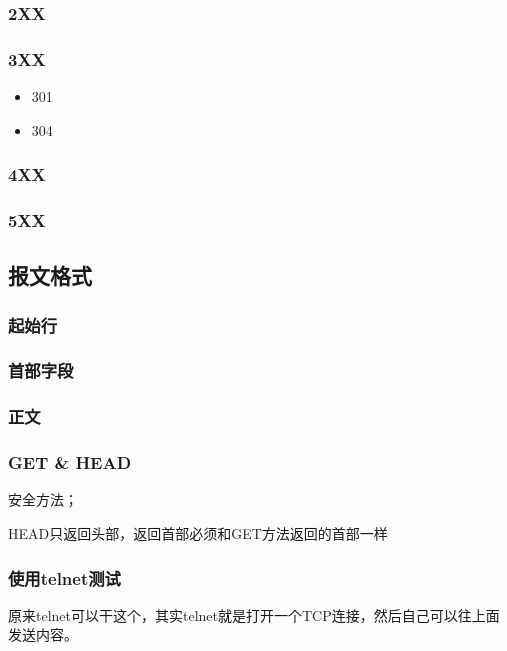 \subsubsection{2XX}

\subsubsection{3XX}

\begin{itemize}
\item 301 
\item 304
\end{itemize}

\subsubsection{4XX}

\subsubsection{5XX}


\subsection{报文格式}


\subsubsection{起始行}

\subsubsection{首部字段}

\subsubsection{正文}

\subsubsection{GET \& HEAD}

安全方法；

HEAD只返回头部，返回首部必须和GET方法返回的首部一样



\subsubsection{使用telnet测试}

原来telnet可以干这个，其实telnet就是打开一个TCP连接，然后自己可以往上面发送内容。


